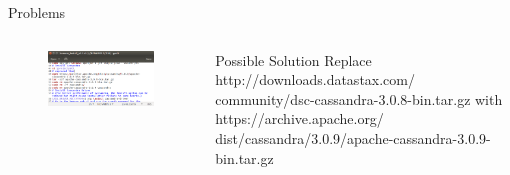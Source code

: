 \documentclass{beamer}
\begin{document}
\begin{frame}[fragile]{Problems}
	\begin{columns}[T]
		\begin{column}{0.5\textwidth}
			\begin{figure}
				\includegraphics[scale=0.25]{figs/datastaxURLFix.png}
			\end{figure}
		\end{column}
		\begin{column}{0.5\textwidth}
			\begin{block}{Possible Solution}
					Replace http://downloads.datastax.com/
					community/dsc-cassandra-3.0.8-bin.tar.gz with https://archive.apache.org/
					dist/cassandra/3.0.9/apache-cassandra-3.0.9-bin.tar.gz
			\end{block}
		\end{column}
	\end{columns}
\end{frame}
\end{document}
